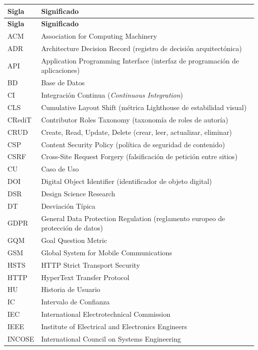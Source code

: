 \documentclass[12pt,a4paper]{report}
\begin{document}
\begin{center}
\small
\begin{longtable}{@{}ll@{}}
\toprule
\textbf{Sigla} & \textbf{Significado} \\
\midrule
\endfirsthead
\toprule
\textbf{Sigla} & \textbf{Significado} \\
\midrule
\endhead
\bottomrule
\endfoot
ACM & Association for Computing Machinery \\
ADR & Architecture Decision Record (registro de decisión arquitectónica) \\
API & Application Programming Interface (interfaz de programación de aplicaciones) \\
BD & Base de Datos \\
CI & Integración Continua (\emph{Continuous Integration}) \\
CLS & Cumulative Layout Shift (métrica Lighthouse de estabilidad visual) \\
CRediT & Contributor Roles Taxonomy (taxonomía de roles de autoría) \\
CRUD & Create, Read, Update, Delete (crear, leer, actualizar, eliminar) \\
CSP & Content Security Policy (política de seguridad de contenido) \\
CSRF & Cross-Site Request Forgery (falsificación de petición entre sitios) \\
CU & Caso de Uso \\
DOI & Digital Object Identifier (identificador de objeto digital) \\
DSR & Design Science Research \\
DT & Desviación Típica \\
GDPR & General Data Protection Regulation (reglamento europeo de protección de datos) \\
GQM & Goal Question Metric \\
GSM & Global System for Mobile Communications \\
HSTS & HTTP Strict Transport Security \\
HTTP & HyperText Transfer Protocol \\
HU & Historia de Usuario \\
IC & Intervalo de Confianza \\
IEC & International Electrotechnical Commission \\
IEEE & Institute of Electrical and Electronics Engineers \\
INCOSE & International Council on Systems Engineering \\

\end{longtable}
\end{center}
\end{document}
